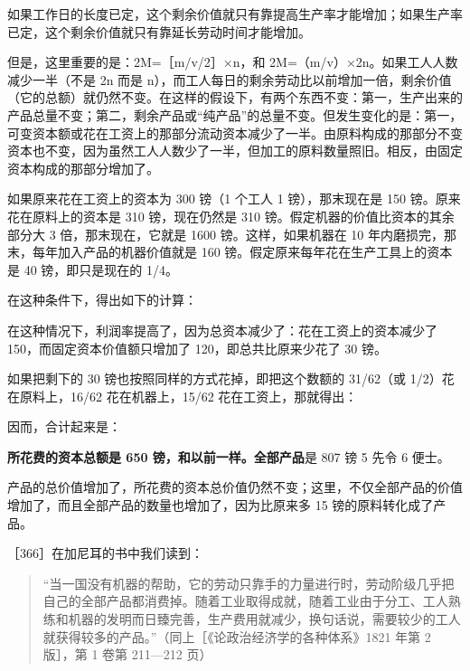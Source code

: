 如果工作日的长度已定，这个剩余价值就只有靠提高生产率才能增加；如果生产率已定，这个剩余价值就只有靠延长劳动时间才能增加。

但是，这里重要的是：2M=［m/v/2］×n，和 2M=（m/v）×2n。如果工人人数减少一半（不是 2n 而是 n），而工人每日的剩余劳动比以前增加一倍，剩余价值（它的总额）就仍然不变。在这样的假设下，有两个东西不变：第一，生产出来的产品总量不变；第二，剩余产品或“纯产品”的总量不变。但发生变化的是：第一，可变资本额或花在工资上的那部分流动资本减少了一半。由原料构成的那部分不变资本也不变，因为虽然工人人数少了一半，但加工的原料数量照旧。相反，由固定资本构成的那部分增加了。

如果原来花在工资上的资本为 300 镑（1 个工人 1 镑），那末现在是 150 镑。原来花在原料上的资本是 310 镑，现在仍然是 310 镑。假定机器的价值比资本的其余部分大 3 倍，那末现在，它就是 1600 镑。这样，如果机器在 10 年内磨损完，那末，每年加入产品的机器价值就是 160 镑。假定原来每年花在生产工具上的资本是 40 镑，即只是现在的 1/4。

在这种条件下，得出如下的计算：

\todo{}

在这种情况下，利润率提高了，因为总资本减少了：花在工资上的资本减少了 150，而固定资本价值额只增加了 120，即总共比原来少花了 30 镑。

如果把剩下的 30 镑也按照同样的方式花掉，即把这个数额的 31/62（或 1/2）花在原料上，16/62 花在机器上，15/62 花在工资上，那就得出：

\todo{}

因而，合计起来是：

\todo{}

\textbf{所花费的资本总额是 650 镑，和以前一样。全部产品}是 807 镑 5 先令 6 便士。

产品的总价值增加了，所花费的资本总价值仍然不变；这里，不仅全部产品的价值增加了，而且全部产品的数量也增加了，因为比原来多 15 镑的原料转化成了产品。

［366］在加尼耳的书中我们读到：

\begin{quote}“当一国没有机器的帮助，它的劳动只靠手的力量进行时，劳动阶级几乎把自己的全部产品都消费掉。随着工业取得成就，随着工业由于分工、工人熟练和机器的发明而日臻完善，生产费用就减少，换句话说，需要较少的工人就获得较多的产品。”（同上［《论政治经济学的各种体系》1821 年第 2 版］，第 1 卷第 211—212 页）\end{quote}

